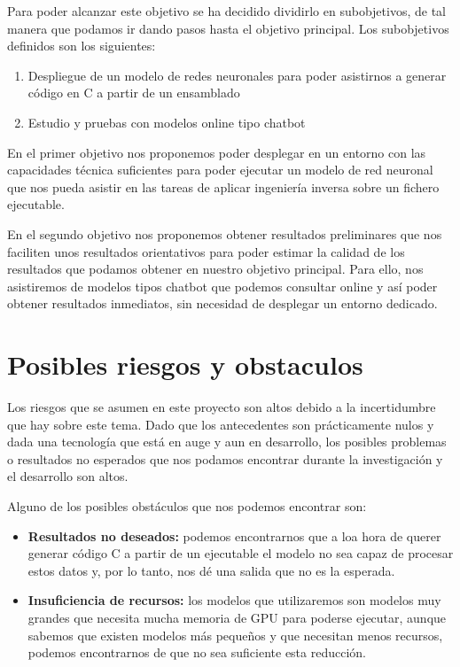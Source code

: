 Para poder alcanzar este objetivo se ha decidido dividirlo en subobjetivos, de tal
manera que podamos ir dando pasos hasta el objetivo principal. Los subobjetivos definidos
son los siguientes:

\begin{enumerate}
    \item Despliegue de un modelo de redes neuronales para poder asistirnos a generar
        código en C a partir de un ensamblado
    \item Estudio y pruebas con modelos online tipo chatbot
\end{enumerate}

En el primer objetivo nos proponemos poder desplegar en un entorno con las capacidades
técnica suficientes para poder ejecutar un modelo de red neuronal que nos pueda asistir en
las tareas de aplicar ingeniería inversa sobre un fichero ejecutable.

En el segundo objetivo nos proponemos obtener resultados preliminares que nos faciliten
unos resultados orientativos para poder estimar la calidad de los resultados que podamos
obtener en nuestro objetivo principal. Para ello, nos asistiremos de modelos tipos chatbot
que podemos consultar online y así poder obtener resultados inmediatos, sin necesidad
de desplegar un entorno dedicado.

\section{Posibles riesgos y obstaculos}
\label{sec:riesgos}


Los riesgos que se asumen en este proyecto son altos debido a la incertidumbre que hay
sobre este tema. Dado que los antecedentes son prácticamente nulos y dada una tecnología
que está en auge y aun en desarrollo, los posibles problemas o resultados no esperados
que nos podamos encontrar durante la investigación y el desarrollo son altos.

Alguno de los posibles obstáculos que nos podemos encontrar son:

\begin{itemize}
    \item \textbf{Resultados no deseados:} podemos encontrarnos que a loa hora de querer
        generar código C a partir de un ejecutable el modelo no sea capaz de procesar estos datos
        y, por lo tanto, nos dé una salida que no es la esperada.
    \item \textbf{Insuficiencia de recursos:} los modelos que utilizaremos son modelos
        muy grandes que necesita mucha memoria de GPU para poderse ejecutar, aunque sabemos que
        existen modelos más pequeños y que necesitan menos recursos, podemos encontrarnos de
        que no sea suficiente esta reducción.
\end{itemize}